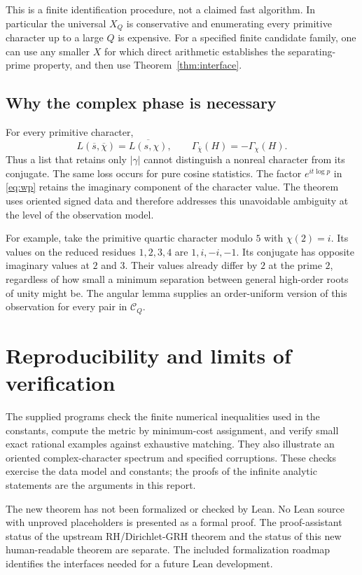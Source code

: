 \documentclass[11pt,letterpaper]{article}
\theoremstyle{definition}\newtheorem{definition}[theorem]{Definition}
\theoremstyle{remark}\newtheorem{remark}[theorem]{Remark}
\newcommand{\Ccal}{\mathcal C}
\begin{document}
This is a finite identification procedure, not a claimed fast
algorithm. In particular the universal $X_Q$ is conservative and
enumerating every primitive character up to a large $Q$ is expensive.
For a specified finite candidate family, one can use any smaller
$X$ for which direct arithmetic establishes the separating-prime
property, and then use Theorem~\ref{thm:interface}.

\subsection{Why the complex phase is necessary}

For every primitive character,
\[
 L(\overline s,\overline\chi)=\overline{L(s,\chi)},
 \qquad \Gamma_{\overline\chi}(H)=-\Gamma_\chi(H).
\]
Thus a list that retains only $|\gamma|$ cannot distinguish a nonreal
character from its conjugate. The same loss occurs for pure cosine
statistics. The factor $e^{it\log p}$ in \eqref{eq:wp} retains the
imaginary component of the character value. The theorem uses oriented
signed data and therefore addresses this unavoidable ambiguity at
the level of the observation model.

For example, take the primitive quartic character modulo $5$ with
$\chi(2)=i$. Its values on the reduced residues $1,2,3,4$ are
$1,i,-i,-1$. Its conjugate has opposite imaginary values at $2$ and
$3$. Their values already differ by $2$ at the prime $2$, regardless
of how small a minimum separation between general high-order roots
of unity might be. The angular lemma supplies an order-uniform
version of this observation for every pair in $\Ccal_Q$.

\section{Reproducibility and limits of verification}



The supplied programs check the finite numerical inequalities used
in the constants, compute the metric by minimum-cost assignment, and
verify small exact rational examples against exhaustive matching.
They also illustrate an oriented complex-character spectrum and
specified corruptions. These checks exercise the data model and
constants; the proofs of the infinite analytic statements are the
arguments in this report.

The new theorem has not been formalized or checked by Lean. No Lean
source with unproved placeholders is presented as a formal proof.
The proof-assistant status of the upstream RH/Dirichlet-GRH theorem
and the status of this new human-readable theorem are separate.
The included formalization roadmap identifies the interfaces needed
for a future Lean development.
\end{document}
